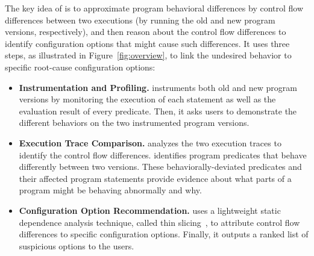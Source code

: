 
The key idea of \ourtool is to approximate program behavioral
differences by control flow differences between 
two executions (by running the old
and new program versions, respectively),
and then reason about the control flow differences to
identify configuration options that
might cause such differences. It uses
three steps, as illustrated in Figure~\ref{fig:overview},  to link the undesired
behavior to specific root-cause configuration options:

\vspace{-2mm}

\begin{itemize}


\item \textbf{Instrumentation and Profiling.} \ourtool
instruments both old and new program versions by 
monitoring the execution of each statement as well as the
evaluation result of every predicate. Then, it asks users to
demonstrate the different behaviors on the two instrumented
program versions. 

\item \textbf{Execution Trace Comparison.}
\ourtool analyzes the two execution traces to identify
the control flow differences. \ourtool
identifies program predicates that behave
differently between two versions. These
behaviorally-deviated predicates and their
affected program statements
provide evidence about what parts of a program might
be behaving abnormally and why.

\item \textbf{Configuration Option Recommendation.} 
\ourtool uses a lightweight static dependence analysis
technique, called thin slicing~\cite{Sridharan:2007}, to attribute
control flow differences to specific configuration options.
Finally, it outputs a ranked list of suspicious options to the users.


\end{itemize}

\vspace{-1mm}

